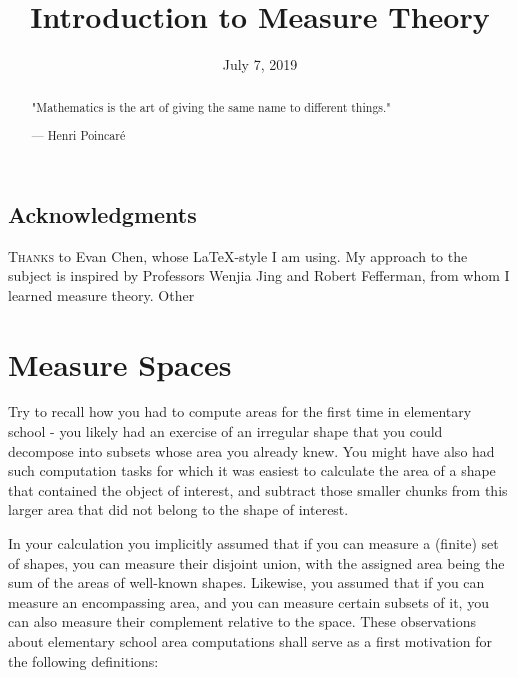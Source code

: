 \documentclass[11pt]{scrartcl}
\begin{document}
\title{Introduction to Measure Theory} %
\date{July 7, 2019}
\maketitle

\begin{abstract}
	\sffamily\small
	"Mathematics is the art of giving the same name to different things."

	\medskip

	--- Henri Poincar\'e
\end{abstract}

\vspace{1em}



\subsection*{Acknowledgments}
\textsc{Thanks} to Evan Chen, whose \LaTeX  -style I am using. My approach to the subject is inspired by Professors Wenjia Jing and Robert Fefferman, from whom I learned measure theory. Other 



\section{Measure Spaces}

Try to recall how you had to compute areas for the first time in elementary school - you likely had an exercise of an irregular shape that you could decompose into subsets whose area you already knew. You might have also had such  computation tasks for which it was easiest to calculate the area of a shape that contained the object of interest, and subtract those smaller chunks from this larger area that did not belong to the shape of interest. 

In your calculation you implicitly assumed that if you can measure a (finite) set of shapes, you can measure their disjoint union, with the assigned area being the sum of the areas of well-known shapes. Likewise, you assumed that if you can measure an encompassing area, and you can measure certain subsets of it, you can also measure their complement relative to the space. These observations about elementary school area computations shall serve as a first motivation for the following definitions: 
\end{document}
